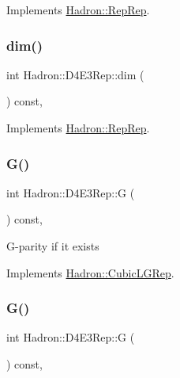 Implements \mbox{\hyperlink{structHadron_1_1RepRep_a92c8802e5ed7afd7da43ccfd5b7cd92b}{Hadron\+::\+Rep\+Rep}}.

\mbox{\label{structHadron_1_1D4E3Rep_a7e048ba087ccbf5ddfade8be991509a0}} 
\subsubsection{\texorpdfstring{dim()}{dim()}\hspace{0.1cm}{\footnotesize\ttfamily [3/3]}}
{\footnotesize\ttfamily int Hadron\+::\+D4\+E3\+Rep\+::dim (\begin{DoxyParamCaption}{ }\end{DoxyParamCaption}) const\hspace{0.3cm}{\ttfamily [inline]}, {\ttfamily [virtual]}}



Implements \mbox{\hyperlink{structHadron_1_1RepRep_a92c8802e5ed7afd7da43ccfd5b7cd92b}{Hadron\+::\+Rep\+Rep}}.

\mbox{\label{structHadron_1_1D4E3Rep_ac9cf1dd84f4cba3fc25d84f22619be44}} 
\subsubsection{\texorpdfstring{G()}{G()}\hspace{0.1cm}{\footnotesize\ttfamily [1/2]}}
{\footnotesize\ttfamily int Hadron\+::\+D4\+E3\+Rep\+::G (\begin{DoxyParamCaption}{ }\end{DoxyParamCaption}) const\hspace{0.3cm}{\ttfamily [inline]}, {\ttfamily [virtual]}}

G-\/parity if it exists 

Implements \mbox{\hyperlink{structHadron_1_1CubicLGRep_ace26f7b2d55e3a668a14cb9026da5231}{Hadron\+::\+Cubic\+L\+G\+Rep}}.

\mbox{\label{structHadron_1_1D4E3Rep_ac9cf1dd84f4cba3fc25d84f22619be44}} 
\subsubsection{\texorpdfstring{G()}{G()}\hspace{0.1cm}{\footnotesize\ttfamily [2/2]}}
{\footnotesize\ttfamily int Hadron\+::\+D4\+E3\+Rep\+::G (\begin{DoxyParamCaption}{ }\end{DoxyParamCaption}) const\hspace{0.3cm}{\ttfamily [inline]}, {\ttfamily [virtual]}}

